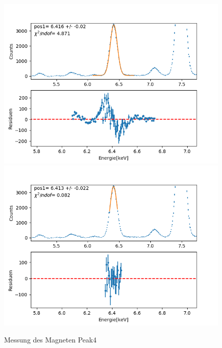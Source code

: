 \documentclass[12pt,a4paper]{article}
\begin{document}
\begin{figure}[H]
\centering
\includegraphics[scale=0.49]{Bilder/roentgen_spektren/magnet/mag4_1.png}
\includegraphics[scale=0.49]{Bilder/roentgen_spektren/magnet/mag4_2.png}
\caption{Messung des Magneten Peak4}
\end{figure}
\end{document}
